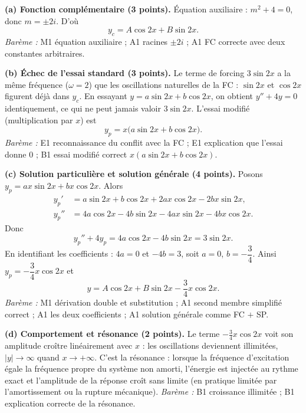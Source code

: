 \documentclass[11pt]{article}
\newcommand{\cle}[1]{{\popxbold\color{popdark}#1}}
\begin{document}
\begin{corrige}
\textbf{(a) Fonction complémentaire (3 points).} Équation auxiliaire : $m^{2} + 4 = 0$, donc $m = \pm 2i$. D'où
\[ y_{c} = A\cos 2x + B\sin 2x. \]
\emph{Barème :} M1 équation auxiliaire ; A1 racines $\pm 2i$ ; A1 FC correcte avec deux constantes arbitraires.

\textbf{(b) Échec de l'essai standard (3 points).} Le terme de forcing $3\sin 2x$ a la même fréquence ($\omega = 2$) que les oscillations naturelles de la FC : $\sin 2x$ et $\cos 2x$ figurent déjà dans $y_{c}$. En essayant $y = a\sin 2x + b\cos 2x$, on obtient $y'' + 4y = 0$ identiquement, ce qui ne peut jamais valoir $3\sin 2x$. L'essai modifié (multiplication par $x$) est
\[ y_{p} = x\big(a\sin 2x + b\cos 2x\big). \]
\emph{Barème :} E1 reconnaissance du conflit avec la FC ; E1 explication que l'essai donne $0$ ; B1 essai modifié correct $x(a\sin 2x + b\cos 2x)$.

\textbf{(c) Solution particulière et solution générale (4 points).} Posons $y_{p} = ax\sin 2x + bx\cos 2x$. Alors
\begin{align*}
y_{p}' &= a\sin 2x + b\cos 2x + 2ax\cos 2x - 2bx\sin 2x,\\
y_{p}'' &= 4a\cos 2x - 4b\sin 2x - 4ax\sin 2x - 4bx\cos 2x.
\end{align*}
Donc
\[ y_{p}'' + 4y_{p} = 4a\cos 2x - 4b\sin 2x = 3\sin 2x. \]
En identifiant les coefficients : $4a = 0$ et $-4b = 3$, soit $a = 0$, $b = -\dfrac{3}{4}$. Ainsi $y_{p} = -\dfrac{3}{4}x\cos 2x$ et
\[ \boxed{y = A\cos 2x + B\sin 2x - \frac{3}{4}x\cos 2x}. \]
\emph{Barème :} M1 dérivation double et substitution ; A1 second membre simplifié correct ; A1 les deux coefficients ; A1 solution générale comme FC $+$ SP.

\textbf{(d) Comportement et résonance (2 points).} Le terme $-\tfrac{3}{4}x\cos 2x$ voit son amplitude croître linéairement avec $x$ : les oscillations deviennent illimitées, $|y| \to \infty$ quand $x \to +\infty$. C'est la \cle{résonance} : lorsque la fréquence d'excitation égale la fréquence propre du système non amorti, l'énergie est injectée au rythme exact et l'amplitude de la réponse croît sans limite (en pratique limitée par l'amortissement ou la rupture mécanique). \emph{Barème :} B1 croissance illimitée ; B1 explication correcte de la résonance.
\end{corrige}
\end{document}
